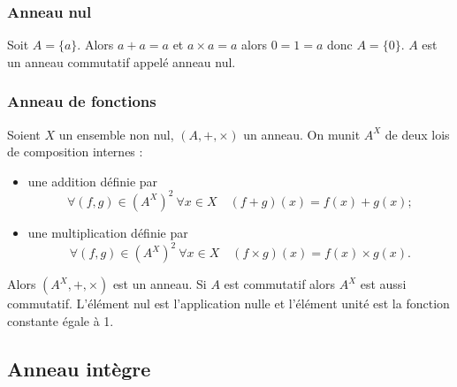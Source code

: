 \subsubsection{Anneau nul}

Soit \(A=\{a\}\). Alors \(a+a=a\) et \(a \times a=a\) alors \(0=1=a\) donc \(A=\{0\}\). \(A\) est un anneau commutatif appelé anneau nul.

\subsubsection{Anneau de fonctions}

Soient \(X\) un ensemble non nul, \((A,+,\times)\) un anneau. On munit \(A^X\) de deux lois de composition internes :
\begin{itemize}
\item une addition définie par
  \begin{equation}
    \forall (f,g) \in \left(A^X\right)^2 \ \forall x \in X \quad (f+g)(x)=f(x)+g(x);
  \end{equation}
\item une multiplication définie par
  \begin{equation}
    \forall (f,g) \in \left(A^X\right)^2 \ \forall x \in X \quad (f \times g)(x)=f(x) \times g(x).
  \end{equation}
\end{itemize}
Alors \((A^X,+,\times)\) est un anneau. Si \(A\) est commutatif alors \(A^X\) est aussi commutatif. L'élément nul est l'application nulle et l'élément unité est la fonction constante égale à 1.

\subsection{Anneau intègre}

